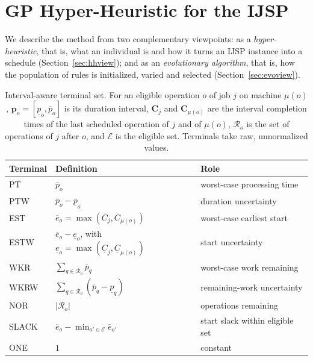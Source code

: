 \documentclass[review,authoryear,11pt]{elsarticle}
\begin{document}
\section{GP Hyper-Heuristic for the IJSP}
\label{sec:method}

We describe the method from two complementary viewpoints: as a
\emph{hyper-heuristic}, that is, what an individual is and how it turns
an IJSP instance into a schedule (Section~\ref{sec:hhview}); and as an
\emph{evolutionary algorithm}, that is, how the population of rules is
initialized, varied and selected (Section~\ref{sec:evoview}).

\begin{table}[!t]
\centering\small
\caption{Interval-aware terminal set. For an eligible operation $o$ of job $j$
on machine $\mu(o)$, $\mathbf{p}_o = [\underline{p}_o, \overline{p}_o]$ is
its duration interval, $\mathbf{C}_j$ and $\mathbf{C}_{\mu(o)}$ are the
interval completion times of the last scheduled operation of $j$ and of
$\mu(o)$, $\mathcal{R}_o$ is the set of operations of $j$ after $o$, and
$\mathcal{E}$ is the eligible set. Terminals take raw, unnormalized
values.}
\label{tab:terminals}
\begin{tabular}{lll}
\toprule
Terminal & Definition & Role \\
\midrule
PT   & $\overline{p}_o$ & worst-case processing time \\
PTW  & $\overline{p}_o-\underline{p}_o$ & duration uncertainty \\
EST  & $\overline{e}_o = \max(\overline{C}_j, \overline{C}_{\mu(o)})$ &
worst-case earliest start \\
ESTW & $\overline{e}_o - \underline{e}_o$, with
$\underline{e}_o=\max(\underline{C}_j,\underline{C}_{\mu(o)})$ &
start uncertainty \\
WKR  & $\sum_{q\in\mathcal{R}_o}\overline{p}_q$ & worst-case work
remaining \\
WKRW & $\sum_{q\in\mathcal{R}_o}(\overline{p}_q-\underline{p}_q)$ &
remaining-work uncertainty \\
NOR  & $|\mathcal{R}_o|$ & operations remaining \\
SLACK& $\overline{e}_o - \min_{o'\in\mathcal{E}}\overline{e}_{o'}$ &
start slack within eligible set \\
ONE  & $1$ & constant \\
\bottomrule
\end{tabular}
\end{table}
\end{document}
